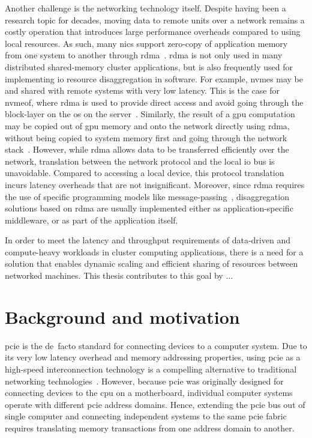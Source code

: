 Another challenge is the networking technology itself. 
Despite having been a research topic for decades, moving data to remote units over a network remains a costly operation that introduces large performance overheads compared to using local resources.
%
As such, many \glspl{nic} support zero-copy of application memory from one system to another through \gls{rdma}~\cite{Huang2012}.
%
\Gls{rdma} is not only used in many distributed shared-memory cluster applications, but is also frequently used for implementing \gls{io} resource \gls{disaggregation} in software.
%
For example, \glspl{nvme} may be  and shared with remote systems with very low latency.
This is the case for \gls{nvmeof}, where \gls{rdma} is used to provide direct access and avoid going through the block-layer on the \gls{os} on the server~\cite{Guz2018}.
%
Similarly, the result of a \gls{gpu} computation may be copied out of \gls{gpu} memory and onto the network directly using \gls{rdma}, without being copied to system memory first and going through the network stack~\cite{Venkatesh2014}.
%
However, while \gls{rdma} allows data to be transferred efficiently over the network, translation between the network protocol and the local \gls{io} bus is unavoidable. 
Compared to accessing a local device, this protocol translation incurs latency overheads that are not insignificant.
%
Moreover, since \gls{rdma} requires the use of specific programming models like message-passing~\cite{Jiang2004}, \gls{disaggregation} solutions based on \gls{rdma} are usually implemented either as application-specific \gls{middleware}, or as part of the application itself.



In order to meet the latency and throughput requirements of data-driven and compute-heavy workloads in cluster computing applications,
there is a need for a solution that enables dynamic scaling and efficient sharing of resources between networked machines. 
%
This thesis contributes to this goal by ...



\section{Background and motivation}\label{sec:motivation}
\Gls{pcie} is the de~facto standard for connecting devices to a computer system.
%
Due to its very low latency overhead and memory addressing properties, using \gls{pcie} as a high-speed interconnection technology is a compelling alternative to traditional networking technologies~\cite{url:Meduri2011,Lim2019}.
%
However, because \gls{pcie} was originally designed for connecting devices to the \gls{cpu} on a motherboard, individual computer systems operate with different \gls{pcie} address domains.
%
Hence, extending the \gls{pcie} bus out of single computer and connecting independent systems to the same \gls{pcie} fabric requires translating memory transactions from one address domain to another.


